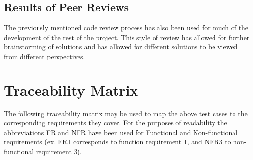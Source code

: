 \documentclass[12pt]{article}
\begin{document}
\subsection{Results of Peer Reviews}

The previously mentioned code review process has also been used for much of the development of the rest of the project. This style of review has allowed for further brainstorming of solutions and has allowed for different solutions to be viewed from different perspectives.


\pagebreak
\section{Traceability Matrix}
The following traceability matrix may be used to map the above test cases to the corresponding requirements they cover. For the purposes of readability the abbreviations FR and NFR have been used for Functional and Non-functional requirements (ex. FR1 corresponds to function requirement 1, and NFR3 to non-functional requirement 3). 
\end{document}
